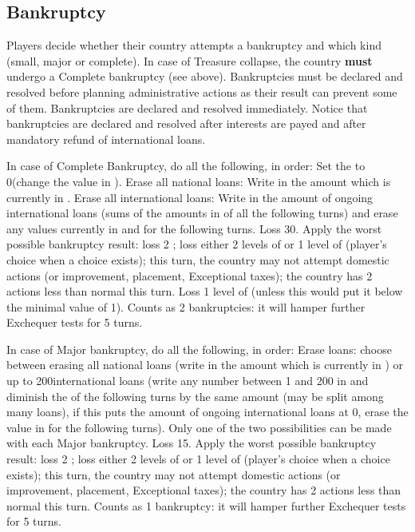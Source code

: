 \subsection{Bankruptcy}\label{chExpenses:bankruptcy}

\aparag Players decide whether their country attempts a bankruptcy and which
kind (small, major or complete).
\bparag In case of Treasure collapse, the country \textbf{must} undergo a
Complete bankruptcy (see above).
\bparag Bankruptcies must be declared and resolved before planning
administrative actions as their result can prevent some of them.
\bparag Bankruptcies are declared and resolved immediately.
\bparag Notice that bankruptcies are declared and resolved after interests are
payed and after mandatory refund of international loans.

 In case of Complete Bankruptcy, do all the
following, in order:
\bparag Set the \RT to 0\ducats (change the value in ).
\bparag Erase all national loans: Write in  the amount which is currently in .
\bparag Erase all international loans: Write in  the amount of ongoing international loans (sums of the amounts
in  of all the following turns) and
erase any values currently in  and
 for the following turns.
\bparag Loss 30\VPs.
\bparag Apply the worst possible bankruptcy result: loss 2 \STAB; loss either
2 levels of \TradeFLEET or 1 level of \MNU (player's choice when a choice
exists); this turn, the country may not attempt domestic actions (\DTI or \FTI
improvement, \MNU placement, Exceptional taxes); the country has 2 \TFI
actions less than normal this turn.
\bparag Loss 1 level of \DTI (unless this would put it below the minimal value
of 1).
\bparag Counts as 2 bankruptcies: it will hamper further Exchequer tests for 5
turns.

 In case of Major bankruptcy, do all the following,
in order:
\bparag Erase loans: choose between erasing all national loans (write in
 the amount which is currently in
) or up to 200\ducats international loans
(write any number between 1 and 200 in 
and diminish the  of the following
turns by the same amount (may be split among many loans), if this puts the
amount of ongoing international loans at 0\ducats, erase the value in
 for the following turns). Only one
of the two possibilities can be made with each Major bankruptcy.
\bparag Loss 15\VPs.
\bparag Apply the worst possible bankruptcy result: loss 2 \STAB; loss either
2 levels of \TradeFLEET or 1 level of \MNU (player's choice when a choice
exists); this turn, the country may not attempt domestic actions (\DTI or \FTI
improvement, \MNU placement, Exceptional taxes); the country has 2 \TFI
actions less than normal this turn.
\bparag Counts as 1 bankruptcy: it will hamper further Exchequer tests for 5
turns.

